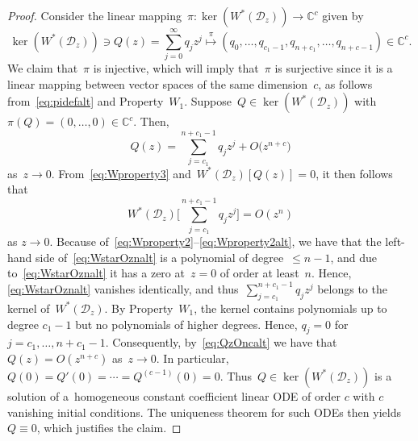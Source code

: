 \documentclass[pdftex]{sigma}
\numberwithin{equation}{section}
\newcommand*{\Cset}{\mathbb{C}} %
\begin{document}
\begin{proof}
 Consider the linear mapping~$\pi\colon \ker(W^*(\mathscr{D}_z)) \to \Cset^c$ given by
 \begin{equation}
 \label{eq:pidefalt}
 \ker(W^*(\mathscr{D}_z)) \ni Q(z) = \sum_{j=0}^{\infty} q_j z^j \stackrel{\pi}{\longmapsto} (q_0, \dots, q_{c_1-1}, q_{n+c_1}, \dots, q_{n+c-1}) \in \Cset^c.
 \end{equation}
 We claim that~$\pi$ is injective, which will imply that~$\pi$ is surjective since it is a linear mapping between vector spaces of the same dimension~$c$, as follows from~\eqref{eq:pidefalt} and Property~$W_1$. Suppose~$Q \in \ker(W^*(\mathscr{D}_z))$ with~$\pi(Q) = (0, \dots, 0) \in \mathbb C^c$. Then,
 \begin{equation}
 \label{eq:QzOncalt}	
 Q(z) = \sum_{j=c_1}^{n+c_1-1} q_j z^j + O\big(z^{n+c}\big)
 \end{equation}
 as~$z \to 0$.
 From~\eqref{eq:Wproperty3} and~$W^*(\mathscr{D}_z)[Q(z)] = 0$, it then follows that
 \begin{equation}
 \label{eq:WstarOznalt}
 W^*(\mathscr{D}_z)\Bigg[ \sum_{j=c_1}^{n+c_1-1} q_j z^j\Bigg] = O(z^n)
 \end{equation}
 as $z \to 0$. Because of~\eqref{eq:Wproperty2}--\eqref{eq:Wproperty2alt}, we have
 that the left-hand side of~\eqref{eq:WstarOznalt} is a polynomial of degree~$\leq n-1$,
 and due to~\eqref{eq:WstarOznalt} it has a zero at~$z=0$ of order at least~$n$. Hence, \eqref{eq:WstarOznalt} vanishes identically, and thus~$\sum_{j=c_1}^{n+c_1-1} q_j z^j$
 belongs to the kernel of~$W^*(\mathscr{D}_z)$. By Property~$W_1$, the kernel contains polynomials up to degree $c_1-1$ but no polynomials of higher degrees. Hence, $q_j=0$ for $j=c_1, \dots, n+c_1-1$. Consequently, by~\eqref{eq:QzOncalt}
 we have that~$Q(z) = O(z^{n+c})$ as~$z \to 0$.
 In particular, $Q(0) = Q'(0) = \cdots = Q^{(c-1)}(0) = 0$.
 Thus~$Q \in \ker(W^*(\mathscr{D}_z))$ is a solution of a~homogeneous constant coefficient linear ODE of order $c$ with $c$ vanishing initial conditions.
The uniqueness theorem for such ODEs then yields~$Q \equiv 0$, which justifies the claim.


\end{proof}
\end{document}
